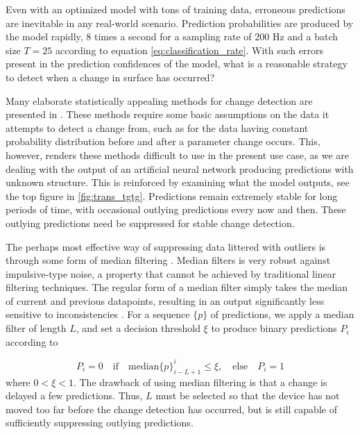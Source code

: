 Even with an optimized model with tons of training data, erroneous predictions are inevitable in any real-world scenario. Prediction probabilities are produced by the model rapidly, 8 times a second for a sampling rate of 200 Hz and a batch size $T=25$ according to equation \ref{eq:classification_rate}. With such errors present in the prediction confidences of the model, what is a reasonable strategy to detect when a change in surface has occurred?  

Many elaborate statistically appealing methods for change detection are presented in \citep{basseville_nikiforov_1993}. These methods require some basic assumptions on the data it attempts to detect a change from, such as for the data having constant probability distribution before and after a parameter change occurs. This, however, renders these methods difficult to use in the present use case, as we are dealing with the output of an artificial neural network producing predictions with unknown structure. This is reinforced by examining what the model outputs, see the top figure in \ref{fig:trans_tgtg}. Predictions remain extremely stable for long periods of time, with occasional outlying predictions every now and then. These outlying predictions need be suppressed for stable change detection.

The perhaps most effective way of suppressing data littered with outliers is through some form of median filtering \citep{yin_yang_gabbouj_neuvo_1996}. Median filters is very robust against impulsive-type noise, a property that cannot be achieved by traditional linear filtering techniques. The regular form of a median filter simply takes the median of current and previous datapoints, resulting in an output significantly less sensitive to inconsistencies \citep{pearson_2002}. For a sequence $\{p\}$ of predictions, we apply a median filter of length $L$, and set a decision threshold $\xi$ to produce binary predictions $P_i$ according to
\citep{yin_yang_gabbouj_neuvo_1996}

\begin{equation}
	P_i=0 \quad\text{if}\quad\text{median}\{p\}_{i-L+1}^i\leq\xi, 
	\quad \text{else} \quad P_i = 1
\end{equation}
where $0<\xi<1$. The drawback of using median filtering is that a change is delayed a few predictions. Thus, $L$ must be selected so that the device has not moved too far before the change detection has occurred, but is still capable of sufficiently  suppressing outlying predictions. 


\iffalse
